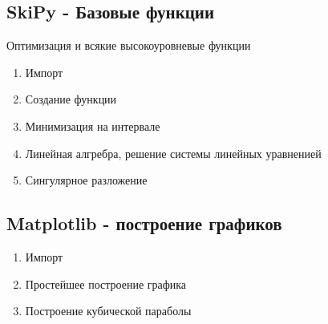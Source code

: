 \subsection{SkiPy - Базовые функции}

Оптимизация и всякие высокоуровневые функции

\begin{enumerate}
\item Импорт  
\item Создание функции 
\item Минимизация на интервале 
\item Линейная алгребра, решение системы линейных уравненией 
\item Сингулярное разложение 
\end{enumerate}

\subsection{Matplotlib - построение графиков}

\begin{enumerate}
\item Импорт 
\item Простейшее построение графика 
\item Построение кубической параболы 
\end{enumerate}

